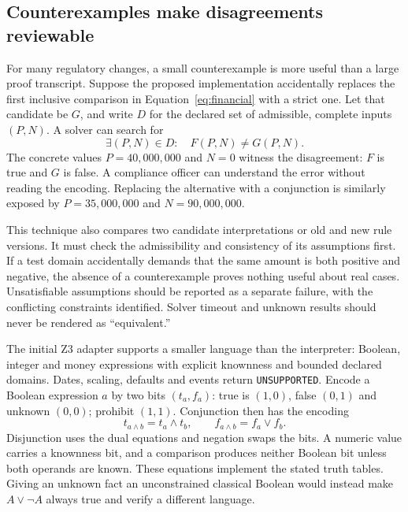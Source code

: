 \subsection{Counterexamples make disagreements reviewable}

For many regulatory changes, a small counterexample is more useful than a large
proof transcript. Suppose the proposed implementation accidentally replaces the
first inclusive comparison in Equation~\eqref{eq:financial} with a strict one.
Let that candidate be $G$, and write $D$ for the declared set of admissible,
complete inputs $(P,N)$. A solver can search for
\begin{equation}
 \exists (P,N)\in D:\quad F(P,N)\ne G(P,N).
 \label{eq:counterexample}
\end{equation}
The concrete values $P=40{,}000{,}000$ and $N=0$ witness the disagreement:
$F$ is true and $G$ is false. A compliance officer can understand the error
without reading the encoding. Replacing the alternative with a conjunction is
similarly exposed by $P=35{,}000{,}000$ and $N=90{,}000{,}000$.

This technique also compares two candidate interpretations or old and new rule
versions. It must check the admissibility and consistency of its assumptions
first. If a test domain accidentally demands that the same amount is both
positive and negative, the absence of a counterexample proves nothing useful
about real cases. Unsatisfiable assumptions should be reported as a separate
failure, with the conflicting constraints identified. Solver timeout and unknown
results should never be rendered as ``equivalent.''

The initial Z3 adapter supports a smaller language than the interpreter:
Boolean, integer and money expressions with explicit knownness and bounded
declared domains. Dates, scaling, defaults and events return
\texttt{UNSUPPORTED}. Encode a Boolean expression $a$ by two bits $(t_a,f_a)$:
true is $(1,0)$, false $(0,1)$ and unknown $(0,0)$; prohibit $(1,1)$.
Conjunction then has the encoding
\begin{equation}
 t_{a\land b}=t_a\land t_b,\qquad
 f_{a\land b}=f_a\lor f_b.
 \label{eq:knownness}
\end{equation}
Disjunction uses the dual equations and negation swaps the bits. A numeric value
carries a knownness bit, and a comparison produces neither Boolean bit unless
both operands are known. These equations implement the stated truth tables.
Giving an unknown fact an unconstrained classical Boolean would instead make
$A\lor\neg A$ always true and verify a different language.

